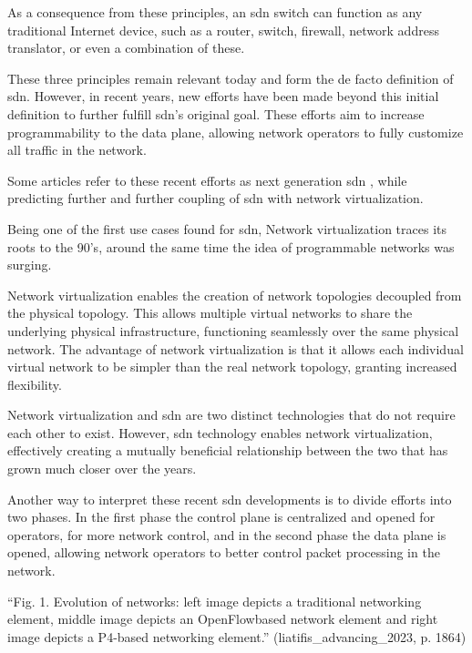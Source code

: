 As a consequence from these principles, an \gls{sdn} switch can function as any traditional Internet device, such as a router, switch, firewall, network address translator, or even a combination of these. 

These three principles remain relevant today and form the de facto definition of \gls{sdn}. However, in recent years, new efforts have been made beyond this initial definition to further fulfill \gls{sdn}'s original goal. These efforts aim to increase programmability to the data plane, allowing network operators to fully customize all traffic in the network.

Some articles refer to these recent efforts as next generation \gls{sdn} \cite{liatifis_advancing_2023} \cite{sofia_shaping_2024}, while predicting further and further coupling of \gls{sdn} with network virtualization.

Being one of the first use cases found for \gls{sdn}, Network virtualization traces its roots to the 90’s, around the same time the idea of programmable networks was surging. \cite{kreutz_software-defined_2015} \cite{feamster_road_2013} 

Network virtualization enables the creation of network topologies decoupled from the physical topology. This allows multiple virtual networks to share the underlying physical infrastructure, functioning seamlessly over the same physical network. \cite{thyagaturu_software_2016} The advantage of network virtualization is that it allows each individual virtual network to be simpler than the real network topology, granting increased flexibility. 

Network virtualization and \gls{sdn} are two distinct technologies that do not require each other to exist. However, \gls{sdn} technology enables network virtualization, effectively creating a mutually beneficial relationship between the two that has grown much closer over the years\cite{feamster_road_2013}.

Another way to interpret these recent \gls{sdn} developments is to divide efforts into two phases. In the first phase the control plane is centralized and opened for operators, for more network control, and in the second phase the data plane is opened, allowing network operators to better control packet processing in the network. 

“Fig. 1. Evolution of networks: left image depicts a traditional networking element, middle image depicts an OpenFlowbased network element and right image depicts a P4-based networking element.” (liatifis_advancing_2023, p. 1864)


